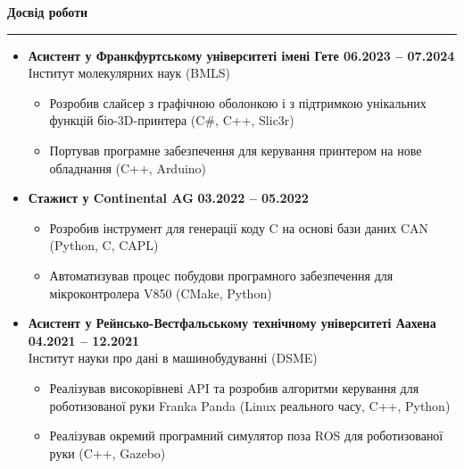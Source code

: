 \documentclass[12pt]{article} %
\newcommand{\HighlightedText}[1] {{\textbf{#1}}}
\newcommand{\PlaceAndTime}[2] {\HighlightedText{#1} \hfill \HighlightedText{#2}}
\newenvironment{ItemizeSection}[1]{
    \vspace{1mm}
    \HighlightedText{#1}
    \vspace{0.5mm}
    {\color{custom_blue} \hrule}
    \begin{itemize}[left=0.5em, topsep=0pt, itemsep=0pt, label={$\bullet$}]
}{
    \end{itemize}
}
\newenvironment{ItemizeSubsection}{
    \begin{itemize}[left=0.5em, topsep=-999pt, itemsep=0pt, label={$\circ$}]
}{
    \end{itemize}
}
\begin{document}
\begin{ItemizeSection}{Досвід роботи}
    \item \PlaceAndTime{Асистент у Франкфуртському університеті імені Гете
    06.2023 -- 07.2024} \\
    Інститут молекулярних наук (BMLS)
    \begin{ItemizeSubsection}
        \item Розробив слайсер з графічною оболонкою і з підтримкою унікальних функцій біо-3D-принтера (C\#, C++, Slic3r)
        \item Портував програмне забезпечення для керування принтером на нове обладнання (C++, Arduino)
    \end{ItemizeSubsection}

    \item \PlaceAndTime{Стажист у Continental AG}{03.2022 -- 05.2022}
    \begin{ItemizeSubsection}
        \item Розробив інструмент для генерації коду C на основі бази даних CAN (Python, C, CAPL)
        \item Автоматизував процес побудови програмного забезпечення для мікроконтролера V850 (CMake, Python)
    \end{ItemizeSubsection}

    \item \PlaceAndTime{Асистент у Рейнсько-Вестфальському технічному університеті Аахена}{04.2021 -- 12.2021} \\
    Інститут науки про дані в машинобудуванні (DSME)
    \begin{ItemizeSubsection}
        \item Реалізував високорівневі API та розробив алгоритми керування для роботизованої руки Franka Panda (Linux реального часу, C++, Python)
        \item Реалізував окремий програмний симулятор поза ROS для роботизованої руки (C++, Gazebo)
    \end{ItemizeSubsection}
\end{ItemizeSection}
\end{document}
